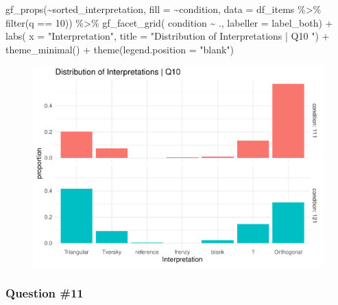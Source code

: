 \documentclass[
  letterpaper,
  DIV=11,
  numbers=noendperiod]{scrreprt}
\newenvironment{Shaded}{\begin{snugshade}}{\end{snugshade}}
\newcommand{\AttributeTok}[1]{\textcolor[rgb]{0.40,0.45,0.13}{#1}}
\newcommand{\DecValTok}[1]{\textcolor[rgb]{0.68,0.00,0.00}{#1}}
\newcommand{\FunctionTok}[1]{\textcolor[rgb]{0.28,0.35,0.67}{#1}}
\newcommand{\NormalTok}[1]{\textcolor[rgb]{0.00,0.23,0.31}{#1}}
\newcommand{\SpecialCharTok}[1]{\textcolor[rgb]{0.37,0.37,0.37}{#1}}
\newcommand{\StringTok}[1]{\textcolor[rgb]{0.13,0.47,0.30}{#1}}
\begin{document}
\begin{Shaded}
\begin{Highlighting}[]
\FunctionTok{gf\_props}\NormalTok{(}\SpecialCharTok{\textasciitilde{}}\NormalTok{sorted\_interpretation, }\AttributeTok{fill =} \SpecialCharTok{\textasciitilde{}}\NormalTok{condition, }\AttributeTok{data =}\NormalTok{ df\_items }\SpecialCharTok{\%\textgreater{}\%} \FunctionTok{filter}\NormalTok{(q }\SpecialCharTok{==} \DecValTok{10}\NormalTok{)) }\SpecialCharTok{\%\textgreater{}\%} 
  \FunctionTok{gf\_facet\_grid}\NormalTok{( condition }\SpecialCharTok{\textasciitilde{}}\NormalTok{ ., }\AttributeTok{labeller =}\NormalTok{ label\_both) }\SpecialCharTok{+} 
  \FunctionTok{labs}\NormalTok{( }\AttributeTok{x =} \StringTok{"Interpretation"}\NormalTok{, }\AttributeTok{title =} \StringTok{"Distribution of Interpretations | Q10 "}\NormalTok{) }\SpecialCharTok{+} 
  \FunctionTok{theme\_minimal}\NormalTok{() }\SpecialCharTok{+} \FunctionTok{theme}\NormalTok{(}\AttributeTok{legend.position =} \StringTok{"blank"}\NormalTok{)}
\end{Highlighting}
\end{Shaded}

\begin{figure}[H]

{\centering \includegraphics{analysis/SGC3A/2_sgc3A_scoring_files/figure-pdf/Q10-distribution-2.pdf}

}

\end{figure}

\hypertarget{question-11}{%
\subsubsection{Question \#11}\label{question-11}}
\end{document}
